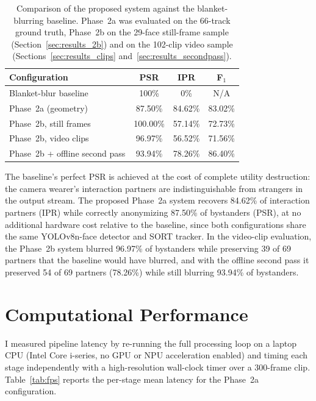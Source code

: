 \begin{table}[htbp]
\begin{singlespace}
\centering
\caption{Comparison of the proposed system against the blanket-blurring baseline.
Phase~2a was evaluated on the 66-track ground truth, Phase~2b on the 29-face
still-frame sample (Section~\ref{sec:results_2b}) and on the 102-clip video sample
(Sections~\ref{sec:results_clips} and~\ref{sec:results_secondpass}).}
\label{tab:vs_baseline}
\renewcommand{\arraystretch}{1.3}
\begin{tabular}{@{}lccc@{}}
\toprule
\textbf{Configuration} & \textbf{PSR} & \textbf{IPR} & \textbf{F$_1$} \\
\midrule
Blanket-blur baseline      & 100\%   & 0\%     & N/A \\
Phase~2a (geometry)        & 87.50\% & 84.62\% & 83.02\% \\
Phase~2b, still frames     & 100.00\% & 57.14\% & 72.73\% \\
Phase~2b, video clips      & 96.97\% & 56.52\% & 71.56\% \\
Phase~2b + offline second pass & 93.94\% & 78.26\% & 86.40\% \\
\bottomrule
\end{tabular}
\end{singlespace}
\end{table}

The baseline's perfect PSR is achieved at the cost of complete utility destruction:
the camera wearer's interaction partners are indistinguishable from strangers in the
output stream. The proposed Phase~2a system recovers 84.62\% of interaction partners
(IPR) while correctly anonymizing 87.50\% of bystanders (PSR), at no additional
hardware cost relative to the baseline, since both configurations share the same
YOLOv8n-face detector and SORT tracker. In the video-clip evaluation, the Phase~2b
system blurred 96.97\% of bystanders while preserving 39 of 69 partners that the
baseline would have blurred, and with the offline second pass it preserved 54 of
69 partners (78.26\%) while still blurring 93.94\% of bystanders.

\section{Computational Performance}
\label{sec:fps}

I measured pipeline latency by re-running the full processing loop on a laptop
CPU (Intel Core i-series, no GPU or NPU acceleration enabled) and timing each stage
independently with a high-resolution wall-clock timer over a 300-frame clip. Table~\ref{tab:fps}
reports the per-stage mean latency for the Phase~2a configuration.

